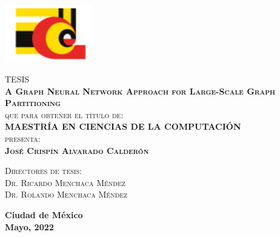 \begin{titlingpage}
\begin{minipage}[c][0.81\textheight][t]{0.3\textwidth}
\begin{center}
    \vspace{160mm}
    \includegraphics[height=2.5cm]{Images/CIC.png}
    \end{center}
  \end{minipage}
  \begin{minipage}[c][0.81\textheight][t]{0.75\textwidth}
    \begin{center}
      \vspace{1cm}          

      \textsc{\LARGE T\hspace{0.5cm}E\hspace{0.5cm}S\hspace{0.5cm}I\hspace{0.5cm}S}\\[2cm]
      {{\Large\scshape\bf A Graph Neural Network Approach for Large-Scale Graph Partitioning }}\\[.2in]

      \vspace{1.5cm} 
      \textsc{\large que para obtener el t\'itulo de:}\\[0.5cm]
      \textsc{\large\bf MAESTRÍA EN CIENCIAS DE LA COMPUTACIÓN}\\[0.5cm]
      
      {\textsc{\large presenta:}}\\[0.5cm]
      \textsc{\bf\large {José Crispín Alvarado Calderón}}\\[1cm]          

      \vspace{0.5cm}

      {\large\scshape 
        {Directores de tesis:}\\[0.3cm] {Dr. Ricardo Menchaca Méndez \\ 
          Dr. Rolando Menchaca Méndez}}\\[.2in]

      \vspace{1cm}

      \bf\normalsize{
        Ciudad de México\\
        Mayo, 2022}
    \end{center}
  \end{minipage}
\end{titlingpage}
\restoregeometry